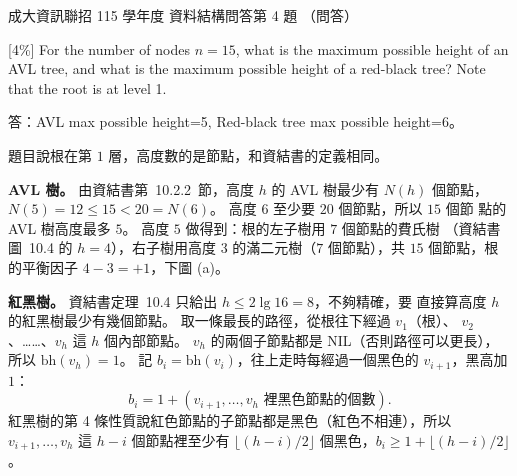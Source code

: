 \begin{pastexam}[label={px:ncku-115-prog-03}]{成大資訊聯招 115 學年度 資料結構問答第 4 題}
（問答）

[4\%] For the number of nodes $n = 15$, what is the maximum possible height of an AVL
tree, and what is the maximum possible height of a red-black tree? Note that the root is
at level 1.\\
\end{pastexam}

\begin{pastsoln}
答：AVL max possible height=5, Red-black tree max possible height=6。

題目說根在第 $1$ 層，高度數的是節點，和資結書的定義相同。

\textbf{AVL 樹。} 由資結書第~10.2.2~節，高度 $h$ 的 AVL 樹最少有 $N(h)$
個節點，$N(5) = 12 \le 15 < 20 = N(6)$。 高度 $6$ 至少要 $20$ 個節點，所以 $15$ 個節
點的 AVL 樹高度最多 $5$。 高度 $5$ 做得到：根的左子樹用 $7$ 個節點的費氏樹
（資結書圖~10.4 的 $h = 4$），右子樹用高度 $3$ 的滿二元樹（$7$ 個節點），共
$15$ 個節點，根的平衡因子 $4 - 3 = +1$，下圖 (a)。

\textbf{紅黑樹。} 資結書定理~10.4 只給出 $h \le 2\lg 16 = 8$，不夠精確，要
直接算高度 $h$ 的紅黑樹最少有幾個節點。 取一條最長的路徑，從根往下經過 $v_1$（根）、
$v_2$、……、$v_h$ 這 $h$ 個內部節點。 $v_h$ 的兩個子節點都是 NIL（否則路徑可以更長），
所以 $\mathrm{bh}(v_h) = 1$。 記 $b_i = \mathrm{bh}(v_i)$，往上走時每經過一個黑色的
$v_{i+1}$，黑高加 $1$：
\[
b_i = 1 + (v_{i+1}, \ldots, v_h \text{ 裡黑色節點的個數}).
\]
紅黑樹的第 4 條性質說紅色節點的子節點都是黑色（紅色不相連），所以 $v_{i+1}, \ldots, v_h$ 這 $h - i$ 個節點裡至少有
$\lfloor (h - i)/2 \rfloor$ 個黑色，$b_i \ge 1 + \lfloor (h-i)/2 \rfloor$。


\end{pastsoln}
